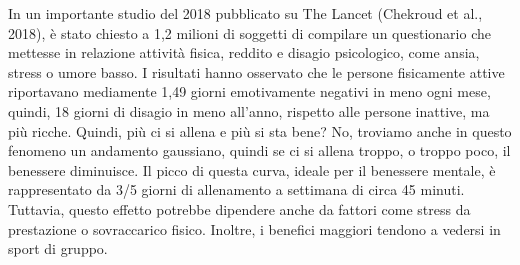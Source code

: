 \documentclass[12pt]{book} %
\begin{document}
\begin{mdframed}[linewidth=1pt]
In un importante studio del 2018 pubblicato su The Lancet (Chekroud et al.,
2018), è stato chiesto a 1,2 milioni di soggetti di compilare un questionario che mettesse in relazione attività fisica, reddito e disagio psicologico, come ansia, stress o umore basso. I risultati hanno osservato che le persone fisicamente attive riportavano mediamente 1,49 giorni emotivamente negativi in meno ogni mese, quindi, 18 giorni di disagio in meno all'anno, rispetto alle persone inattive, ma più ricche. Quindi, più ci si allena e più si sta bene? No, troviamo anche in questo fenomeno un andamento gaussiano, quindi se ci si allena troppo, o troppo poco, il benessere diminuisce. Il picco di questa curva, ideale per il benessere mentale, è rappresentato da 3/5 giorni di allenamento a settimana di circa 45 minuti. Tuttavia, questo effetto potrebbe dipendere anche da fattori come stress da prestazione o sovraccarico fisico. 
Inoltre, i benefici maggiori tendono a vedersi in sport di gruppo.
\end{mdframed}
\end{document}
